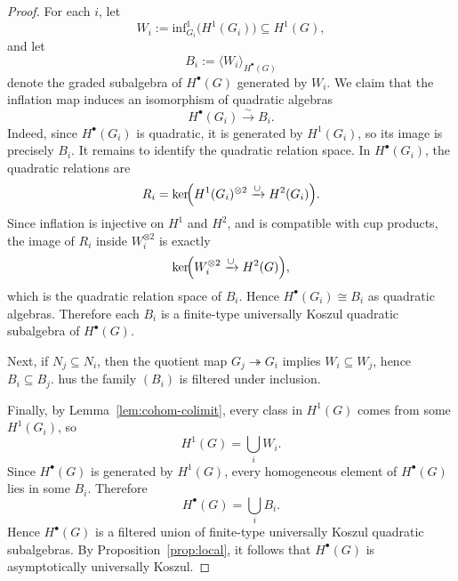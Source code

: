 \documentclass[10pt,a4paper]{amsart}
\begin{document}
	\begin{proof}
		For each \(i\), let
		\[W_i:=\mathrm{inf}^1_{G_i}\bigl(H^1(G_i)\bigr)\subseteq H^1(G),\] and let
		\[B_i:=\langle W_i\rangle_{H^\bullet(G)}\]
		denote the graded subalgebra of \(H^\bullet(G)\) generated by \(W_i\). We claim that the inflation map induces an isomorphism of quadratic algebras
		\[H^\bullet(G_i)\xrightarrow{\sim} B_i.\]
		Indeed, since \(H^\bullet(G_i)\) is quadratic, it is generated by \(H^1(G_i)\), so its image is precisely \(B_i\). It remains to identify the quadratic relation space. In \(H^\bullet(G_i)\), the quadratic relations are
		\[R_i=\ker\!\Bigl(H^1(G_i)^{\otimes 2}\xrightarrow{\cup} H^2(G_i)\Bigr).\]
		Since inflation is injective on \(H^1\) and \(H^2\), and is compatible with cup products, the image of \(R_i\) inside \(W_i^{\otimes 2}\) is exactly
		\[\ker\!\Bigl(W_i^{\otimes 2}\xrightarrow{\cup} H^2(G)\Bigr),\]
		which is the quadratic relation space of \(B_i\). Hence $H^\bullet(G_i)\cong B_i$ as quadratic algebras. Therefore each \(B_i\) is a finite-type universally Koszul quadratic subalgebra of \(H^\bullet(G)\).
		
		Next, if \(N_j\subseteq N_i\), then the quotient map \(G_j\twoheadrightarrow G_i\) implies $W_i\subseteq W_j$, hence $B_i\subseteq B_j$. hus the family \((B_i)\) is filtered under inclusion.
		
		Finally, by Lemma~\ref{lem:cohom-colimit}, every class in \(H^1(G)\) comes from some \(H^1(G_i)\), so \[H^1(G)=\bigcup_i W_i.\]
		Since \(H^\bullet(G)\) is generated by \(H^1(G)\), every homogeneous element of \(H^\bullet(G)\) lies in some \(B_i\). Therefore \[H^\bullet(G)=\bigcup_i B_i.\] Hence \(H^\bullet(G)\) is a filtered union of finite-type universally Koszul quadratic subalgebras. By Proposition~\ref{prop:local}, it follows that \(H^\bullet(G)\) is asymptotically universally Koszul.
	\end{proof}
\end{document}
